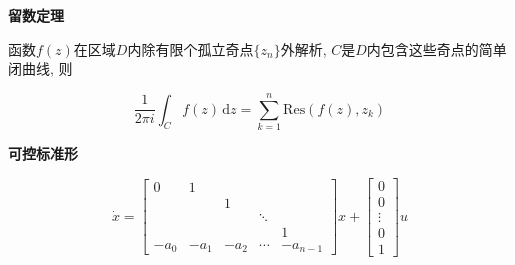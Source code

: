 \textbf{留数定理}

函数\(f(z)\)在区域\(D\)内除有限个孤立奇点\(\{z_n\}\)外解析, \(C\)是\(D\)内包含这些奇点的简单闭曲线, 则

\begin{equation}
    \frac1{2\pi i}\int_Cf(z)\,\text{d} z=\sum\limits_{k=1}^n\text{Res}(f(z),z_k)
\end{equation}

\textbf{可控标准形}

\begin{equation}
    \dot x=
    \begin{bmatrix}
        0& 1  \\
        && 1 \\
        &&&\ddots \\
        &&&&1\\
        -a_0 & -a_1 & -a_2 & \cdots & -a_{n-1}
    \end{bmatrix}
    x+
    \begin{bmatrix}
        0\\
        0\\
        \vdots\\
        0\\
        1
    \end{bmatrix}u
\end{equation}
